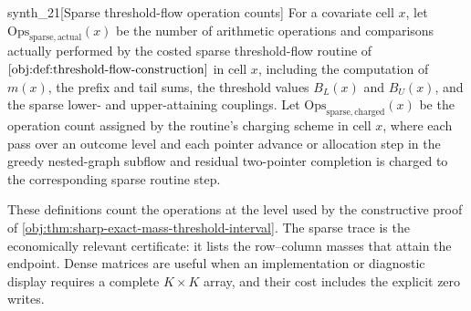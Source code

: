 \begin{definitionv}{synth_21}[Sparse threshold-flow operation counts]
For a covariate cell \(x\), let \(\mathrm{Ops}_{\mathrm{sparse,actual}}(x)\) be the number of arithmetic operations and comparisons actually performed by the costed sparse threshold-flow routine of \(\cref{obj:def:threshold-flow-construction}\) in cell \(x\), including the computation of \(m(x)\), the prefix and tail sums, the threshold values \(B_L(x)\) and \(B_U(x)\), and the sparse lower- and upper-attaining couplings. Let \(\mathrm{Ops}_{\mathrm{sparse,charged}}(x)\) be the operation count assigned by the routine's charging scheme in cell \(x\), where each pass over an outcome level and each pointer advance or allocation step in the greedy nested-graph subflow and residual two-pointer completion is charged to the corresponding sparse routine step.
\end{definitionv}

These definitions count the operations at the level used by the constructive proof of \cref{obj:thm:sharp-exact-mass-threshold-interval}.  The sparse trace is the economically relevant certificate: it lists the row--column masses that attain the endpoint.  Dense matrices are useful when an implementation or diagnostic display requires a complete \(K\times K\) array, and their cost includes the explicit zero writes.

